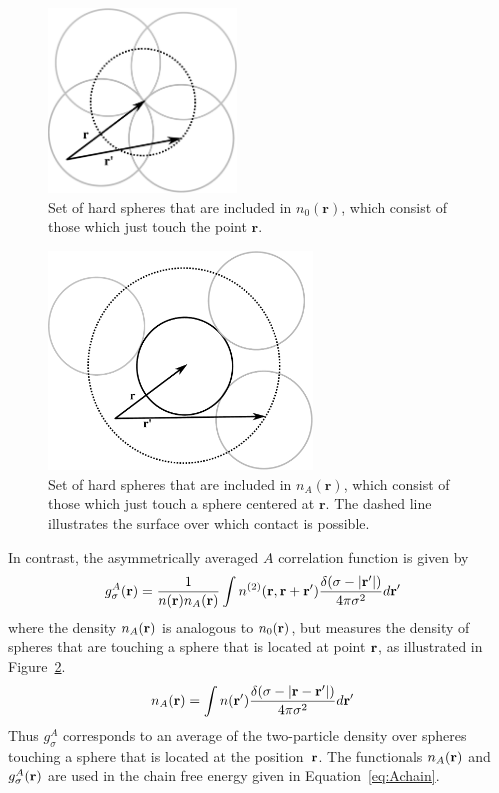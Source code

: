 \begin{figure}
\includegraphics[width=5cm]{figs/n0}
\caption{Set of hard spheres that are included in $n_0(\mathbf{r})$, which
  consist of those which just touch the point $\mathbf{r}$.}
\label{fig:n0}
\end{figure}

\begin{figure}
\includegraphics[width=7cm]{figs/nA}
\caption{Set of hard spheres that are included in $n_A(\mathbf{r})$,
  which consist of those which just touch a sphere centered at
  $\mathbf{r}$.  The dashed line illustrates the surface over which
  contact is possible.}
\label{fig:nA}
\end{figure}

In contrast, the asymmetrically averaged $A$ correlation function is
given by
\begin{align}
  g^A_\sigma(\textbf{r}) &= \frac{1}{n(\textbf{r})n_A(\textbf{r})}
  \int n^{(2)}(\textbf{r}, \textbf{r} + \textbf{r}')
  \frac{\delta(\sigma -|\textbf{r}'|)}{4\pi\sigma^2}d\textbf{r}' \label{eq:gA}
\end{align}
where the density $n_A(\textbf{r})$ is analogous to $n_0(\textbf{r})$, but measures the
density of spheres that are touching a sphere that is located at
point $\textbf{r}$, as illustrated in Figure~\ref{fig:nA}.
\begin{align}
  n_A(\textbf{r}) &= \int n(\textbf{r}')
  \frac{\delta(\sigma -|\textbf{r}-\textbf{r}'|)}{4\pi\sigma^2} d\textbf{r}' \label{eq:nA}
\end{align}
Thus $g_\sigma^A$ corresponds to an average of the two-particle
density over spheres touching a sphere that is located at the
position~$\textbf{r}$.  The functionals $n_A(\textbf{r})$ and $g_\sigma^A(\textbf{r})$ are
used in the chain free energy given in Equation~\ref{eq:Achain}.

